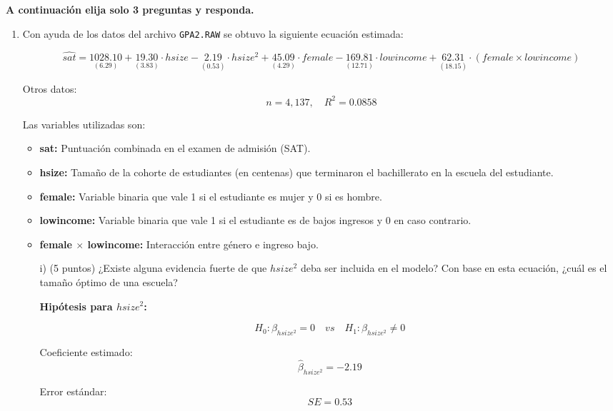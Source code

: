 \documentclass[10pt,a4paper]{article}
\begin{document}
{\bf A continuación elija solo 3 preguntas y responda. }

\begin{enumerate}
 \item  Con ayuda de los datos del archivo \texttt{GPA2.RAW} se obtuvo la siguiente ecuación estimada:

\[
\widehat{sat} =
\underset{(6.29)}{1028.10} +
\underset{(3.83)}{19.30} \cdot hsize -
\underset{(0.53)}{2.19} \cdot hsize^2 +
\underset{(4.29)}{45.09} \cdot female -
\underset{(12.71)}{169.81} \cdot lowincome +
\underset{(18.15)}{62.31} \cdot (female \times lowincome)
\]


\vspace{1em}
\noindent
Otros datos:
\[
n = 4{,}137, \quad R^2 = 0.0858
\]

\vspace{1em}
\noindent
Las variables utilizadas son:

\begin{itemize}
    \item \textbf{sat:} Puntuación combinada en el examen de admisión (SAT).
    \item \textbf{hsize:} Tamaño de la cohorte de estudiantes (en centenas) que terminaron el bachillerato en la escuela del estudiante.
    \item \textbf{female:} Variable binaria que vale 1 si el estudiante es mujer y 0 si es hombre.
    \item \textbf{lowincome:} Variable binaria que vale 1 si el estudiante es de bajos ingresos y 0 en caso contrario.
    \item \textbf{female $\times$ lowincome:} Interacción entre género e ingreso bajo.
\end{itemize}

\vspace{1em}

\begin{enumerate}
    \item[i)] (5 puntos) ¿Existe alguna evidencia fuerte de que $hsize^2$ deba ser incluida en el modelo? Con base en esta ecuación, ¿cuál es el tamaño óptimo de una escuela?

{\color{blue}
\textbf{Hipótesis para \( hsize^2 \):}

\[
H_0: \beta_{hsize^2} = 0 \quad vs \quad H_1: \beta_{hsize^2} \neq 0
\]

Coeficiente estimado:  
\[
\hat{\beta}_{hsize^2} = -2.19
\]

Error estándar:  
\[
SE = 0.53
\]

}
\end{enumerate}
\end{enumerate}
\end{document}
